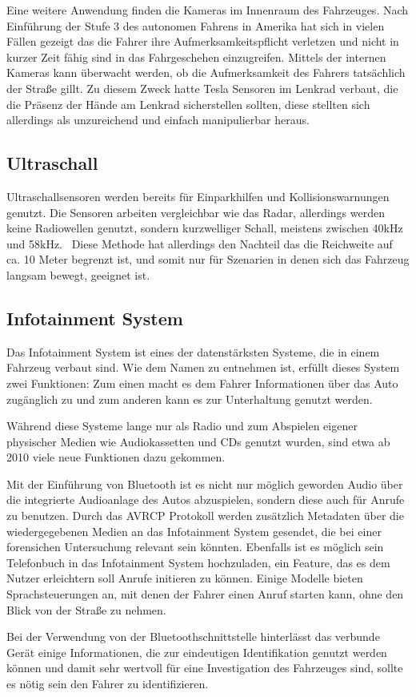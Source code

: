 \documentclass[conference,compsoc,final,a4paper]{IEEEtran}
\begin{document}
Eine weitere Anwendung finden die Kameras im Innenraum des Fahrzeuges.
Nach Einführung der Stufe 3 des autonomen Fahrens in Amerika hat sich in vielen Fällen gezeigt das die Fahrer
ihre Aufmerksamkeitspflicht verletzen und nicht in kurzer Zeit fähig sind in das Fahrgeschehen einzugreifen.
Mittels der internen Kameras kann überwacht werden, ob die Aufmerksamkeit des Fahrers tatsächlich der Straße gillt.
Zu diesem Zweck hatte Tesla Sensoren im Lenkrad verbaut, die die Präsenz der Hände am Lenkrad sicherstellen sollten,
diese stellten sich allerdings als unzureichend und einfach manipulierbar heraus.~\cite{Trudell2021}

\subsection{Ultraschall}

Ultraschallsensoren werden bereits für Einparkhilfen und Kollisionswarnungen genutzt.
Die Sensoren arbeiten vergleichbar wie das Radar, allerdings werden keine Radiowellen genutzt,
sondern kurzwelliger Schall, meistens zwischen 40kHz und 58kHz.~\cite{Zhaohua2020}
Diese Methode hat allerdings den Nachteil das die Reichweite auf ca. 10 Meter begrenzt ist, und somit nur
für Szenarien in denen sich das Fahrzeug langsam bewegt, geeignet ist.~\cite{Petit2022}

\subsection{Infotainment System}

Das Infotainment System ist eines der datenstärksten Systeme, die in einem Fahrzeug verbaut sind.
Wie dem Namen zu entnehmen ist, erfüllt dieses System zwei Funktionen:
Zum einen macht es dem Fahrer Informationen über das Auto zugänglich zu und zum anderen kann es zur Unterhaltung genutzt werden.

Während diese Systeme lange nur als Radio und zum Abspielen eigener physischer Medien wie Audiokassetten und CDs genutzt wurden,
sind etwa ab 2010 viele neue Funktionen dazu gekommen.~\cite{Rossi2021}\par

Mit der Einführung von Bluetooth ist es nicht nur möglich geworden Audio über die integrierte Audioanlage des Autos abzuspielen,
sondern diese auch für Anrufe zu benutzen. Durch das \ac{AVRCP} Protokoll werden zusätzlich Metadaten über die wiedergegebenen Medien
an das Infotainment System gesendet, die bei einer forensichen Untersuchung relevant sein könnten.
Ebenfalls ist es möglich sein Telefonbuch in das Infotainment System hochzuladen, ein Feature, das es dem Nutzer erleichtern soll
Anrufe initieren zu können. Einige Modelle bieten Sprachsteuerungen an, mit denen der Fahrer einen Anruf starten kann, ohne den Blick von
der Straße zu nehmen.\par
Bei der Verwendung von der Bluetoothschnittstelle hinterlässt das verbunde Gerät einige Informationen, die zur eindeutigen Identifikation
genutzt werden können und damit sehr wertvoll für eine Investigation des Fahrzeuges sind, sollte es nötig sein den Fahrer zu identifizieren.
\end{document}
